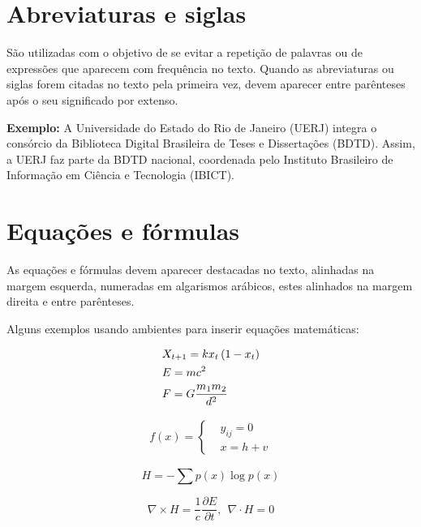\section{Abreviaturas e siglas}

São utilizadas com o objetivo de se evitar a repetição de palavras ou de expressões que aparecem com frequência no texto. Quando as abreviaturas ou siglas forem citadas no texto pela primeira vez, devem aparecer entre parênteses após o seu significado por extenso.

\textbf{Exemplo:} A Universidade do Estado do Rio de Janeiro (UERJ) integra o consórcio da Biblioteca Digital Brasileira de Teses e Dissertações (BDTD). Assim, a UERJ faz parte da BDTD nacional, coordenada pelo Instituto Brasileiro de Informação em Ciência e Tecnologia (IBICT).


\section{Equações e fórmulas}

As equações e fórmulas devem aparecer destacadas no texto, alinhadas na margem esquerda, numeradas em algarismos arábicos, estes
alinhados na margem direita e entre parênteses. 

Alguns exemplos usando ambientes para inserir equações matemáticas:

\begin{align}
    & X_{t+1} = kx_t\left(1-x_t\right) \notag \\
    & E = mc^2\\
    & F = G \dfrac{m_1 m_2}{d^2}
\end{align}

\begin{gather}
    f(x)=\left\{\begin{aligned}
    & y_{ij} = 0\\
    & x = h + v
\end{aligned}\right.
\end{gather}

\begin{equation} 
    H = - \sum p(x) \log p(x)
\end{equation}

\begin{equation*}
    \nabla \times H = \dfrac{1}{c}\dfrac{\partial E}{\partial t},~~ \nabla\cdot H = 0
\end{equation*}

